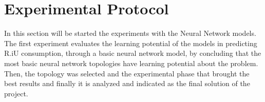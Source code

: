                 \begin{figure}[H]
                \end{figure}  

        
                       \begin{figure}[H]
                \end{figure}
           

\section{Experimental Protocol}
    In this section will be started the experiments with the Neural Network models.
    The first experiment evaluates the learning potential of the models in predicting R.iU consumption, through a basic neural network model, by concluding that the most basic neural network topologies have learning potential about the problem.
    Then, the topology was selected and the experimental phase that brought the best results and finally it is analyzed and indicated as the final solution of the project.
    
